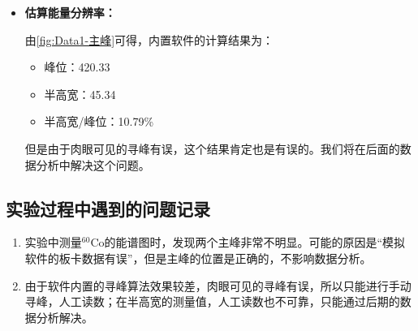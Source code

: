 \documentclass[dvipsnames, svgnames,a4paper,11pt]{article}
\begin{document}
\begin{itemize}
		\item \textbf{估算能量分辨率：}
		
			由\cref{fig:Data1-主峰}可得，内置软件的计算结果为：

			\begin{itemize}
				\item 峰位：420.33
				\item 半高宽：45.34
				\item 半高宽/峰位：10.79\%
			\end{itemize}

			但是由于肉眼可见的寻峰有误，这个结果肯定也是有误的。我们将在后面的数据分析中解决这个问题。
			
			



	\end{itemize}
		




		


	\subsection{实验过程中遇到的问题记录}

		\begin{enumerate}
			\item 实验中测量$^{60}\mathrm{Co}$的能谱图时，发现两个主峰非常不明显。可能的原因是“模拟软件的板卡数据有误”，但是主峰的位置是正确的，不影响数据分析。
			\item 由于软件内置的寻峰算法效果较差，肉眼可见的寻峰有误，所以只能进行手动寻峰，人工读数；在半高宽的测量值，人工读数也不可靠，只能通过后期的数据分析解决。
				
		\end{enumerate}
\end{document}
